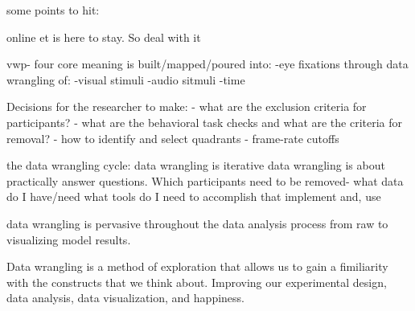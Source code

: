 some points to hit:


online et is here to stay. So deal with it

vwp- four core
meaning is built/mapped/poured into:
-eye fixations
through data wrangling of:
-visual stimuli
-audio sitmuli
-time

Decisions for the researcher to make:
- what are the exclusion criteria for participants?
- what are the behavioral task checks and what are the criteria for removal?
- how to identify and select quadrants
- frame-rate cutoffs



the data wrangling cycle: 
data wrangling is iterative
data wrangling is about practically answer questions. Which participants need to be removed-
what data do I have/need
what tools do I need to accomplish that
implement
and, use

data wrangling is pervasive throughout the data analysis process from raw to visualizing model results.

Data wrangling is a method of exploration that allows us to gain a fimiliarity with the constructs that we think about. Improving our experimental design, data analysis, data visualization, and happiness.